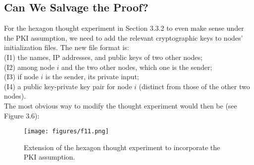 \subsection{Can We Salvage the Proof?}
For the hexagon thought experiment in Section 3.3.2 to even make sense under the PKI
assumption, we need to add the relevant cryptographic keys to nodes’ initialization files.
The new file format is:\\
\noindent
(I1) the names, IP addresses, and public keys of two other nodes;\\
\noindent
(I2) among node $i$ and the two other nodes, which one is the sender;\\
\noindent
(I3) if node $i$ is the sender, its private input;\\
\noindent
(I4) a public key-private key pair for node $i$ (distinct from those of the other two nodes).\\

\noindent
The most obvious way to modify the thought experiment would then be (see Figure 3.6):
\begin{figure}[h]
    \centering
    \texttt{[image: figures/f11.png]}
    \caption{Extension of the hexagon thought experiment to incorporate the PKI assumption.}
    \label{fig:mesh1}
\end{figure}\\

